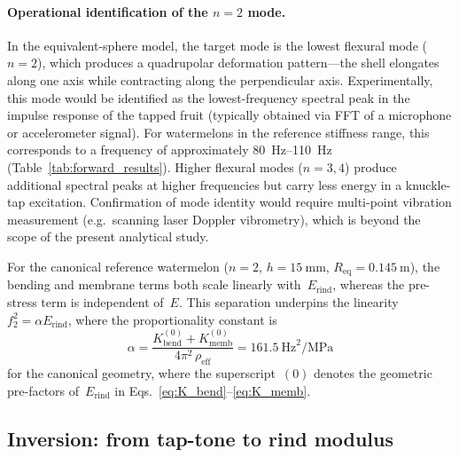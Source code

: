 \paragraph{Operational identification of the $n = 2$ mode.}
In the equivalent-sphere model, the target mode is the lowest flexural
mode ($n = 2$), which produces a quadrupolar deformation pattern---the
shell elongates along one axis while contracting along the
perpendicular axis.  Experimentally, this mode would be identified as
the lowest-frequency spectral peak in the impulse response of the
tapped fruit (typically obtained via FFT of a microphone or
accelerometer signal).  For watermelons in the reference stiffness range, this
corresponds to a frequency of approximately \SIrange{80}{110}{\hertz}
(Table~\ref{tab:forward_results}).  Higher flexural modes ($n = 3, 4$)
produce additional spectral peaks at higher frequencies but carry less
energy in a knuckle-tap excitation.  Confirmation of mode identity
would require multi-point vibration measurement (e.g.\ scanning laser
Doppler vibrometry), which is beyond the scope of the present
analytical study.

For the canonical reference watermelon ($n = 2$, $h = \SI{15}{\milli\metre}$,
$R_{\mathrm{eq}} = \SI{0.145}{\metre}$), the bending and membrane
terms both scale linearly with~$E_{\mathrm{rind}}$, whereas the
pre-stress term is independent of~$E$.  This separation underpins the
linearity $f_2^2 = \alpha E_{\mathrm{rind}}$, where the proportionality
constant is
\begin{equation}
  \alpha = \frac{K_{\mathrm{bend}}^{(0)} + K_{\mathrm{memb}}^{(0)}}
    {4\pi^2\, \rho_{\mathrm{eff}}}
    = \SI{161.5}{\hertz\squared\per\mega\pascal}
  \label{eq:alpha_value}
\end{equation}
for the canonical geometry, where the superscript~$(0)$ denotes the
geometric pre-factors of~$E_{\mathrm{rind}}$ in
Eqs.~\eqref{eq:K_bend}--\eqref{eq:K_memb}.

\subsection{Inversion: from tap-tone to rind modulus}
\label{sec:inversion}

